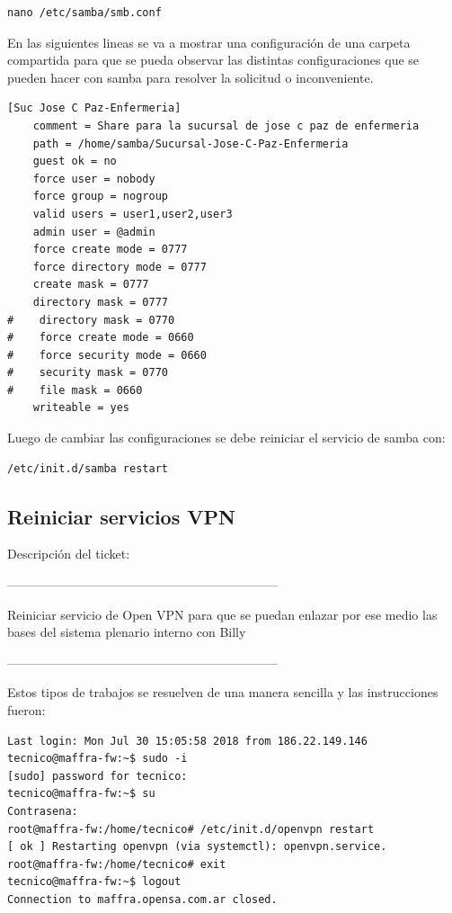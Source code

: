 \documentclass[12pt,a4paper]{article}
\begin{document}
\begin{lstlisting}
nano /etc/samba/smb.conf
\end{lstlisting}

En las siguientes lineas se va a mostrar una configuración de una carpeta compartida para que se pueda observar las distintas configuraciones que se pueden hacer con samba para resolver la solicitud o inconveniente.

\begin{lstlisting}
[Suc Jose C Paz-Enfermeria]
    comment = Share para la sucursal de jose c paz de enfermeria
    path = /home/samba/Sucursal-Jose-C-Paz-Enfermeria
    guest ok = no
    force user = nobody
    force group = nogroup
    valid users = user1,user2,user3
    admin user = @admin
    force create mode = 0777
    force directory mode = 0777
    create mask = 0777
    directory mask = 0777
#    directory mask = 0770
#    force create mode = 0660
#    force security mode = 0660
#    security mask = 0770
#    file mask = 0660
    writeable = yes
\end{lstlisting}

Luego de cambiar las configuraciones se debe reiniciar el servicio de samba con:

\begin{lstlisting}
/etc/init.d/samba restart
\end{lstlisting}

\subsection{Reiniciar servicios VPN}
Descripción del ticket:

\begin{center}
-----------------------------------------------------------------
\end{center}
Reiniciar servicio de Open VPN para que se puedan enlazar por ese medio las bases del sistema plenario interno con Billy
\begin{center}
-----------------------------------------------------------------
\end{center}

Estos tipos de trabajos se resuelven de una manera sencilla y las instrucciones fueron:

\begin{lstlisting}
Last login: Mon Jul 30 15:05:58 2018 from 186.22.149.146
tecnico@maffra-fw:~$ sudo -i
[sudo] password for tecnico: 
tecnico@maffra-fw:~$ su
Contrasena: 
root@maffra-fw:/home/tecnico# /etc/init.d/openvpn restart
[ ok ] Restarting openvpn (via systemctl): openvpn.service.
root@maffra-fw:/home/tecnico# exit
tecnico@maffra-fw:~$ logout
Connection to maffra.opensa.com.ar closed.
\end{lstlisting}
\end{document}
